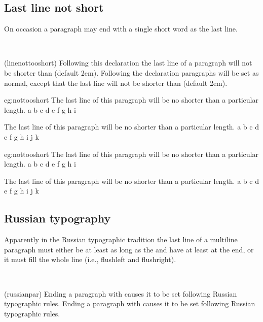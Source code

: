     
\subsection{Last line not short}

    On occasion a paragraph may end with a single short word as the last
line.

\begin{syntax}
\cmd{\linenottooshort} \\
\end{syntax}
\glossary(linenottooshort)%
  {}%
  {Following this declaration the last line of a paragraph will not be
   shorter than  (default 2em).}
Following the \cmd{\linenottooshort} declaration paragraphs will be set
as normal, except that the last line will not be shorter than
 (default 2em).


\begin{egresult}{eg:nottooshort}
\linenottooshort[4em]
The last line of this paragraph will be no shorter than a particular
length. a b c d e f g h i %

The last line of this paragraph will be no shorter than a particular
length. a b c d e f g h i j k %
\end{egresult}

\begin{egsource}{eg:nottooshort}
\linenottooshort[4em]
The last line of this paragraph will be no shorter than a particular
length. a b c d e f g h i %

The last line of this paragraph will be no shorter than a particular
length. a b c d e f g h i j k %
\end{egsource}

\subsection{Russian typography}

    Apparently in the Russian typographic tradition the last line of a
multiline paragraph must either be at least as long as the \lnc{\parindent}
and have at least \lnc{\parindent} at the end, or it must fill 
the whole line (i.e., flushleft and flushright).

\begin{syntax}
\cmd{\russianpar} \\
\end{syntax}
\glossary(russianpar)%
  {}%
  {Ending a paragraph with  causes it to be set
   following Russian typographic rules.}
Ending a paragraph with \cmd{\russianpar} causes it to be set following
Russian typographic rules.

